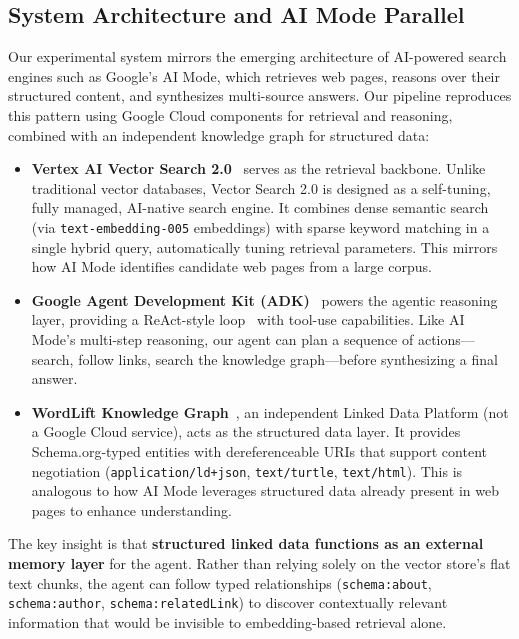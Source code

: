 \documentclass[runningheads]{llncs}
\begin{document}
\subsection{System Architecture and AI Mode Parallel}

Our experimental system mirrors the emerging architecture of AI-powered
search engines such as Google's AI Mode, which retrieves web pages,
reasons over their structured content, and synthesizes multi-source
answers.  Our pipeline reproduces this pattern using Google
Cloud components for retrieval and reasoning, combined with an
independent knowledge graph for structured data:

\begin{itemize}
    \item \textbf{Vertex AI Vector Search 2.0}~\cite{vertexai2025} serves
          as the retrieval backbone.  Unlike traditional vector databases,
          Vector Search 2.0 is designed as a self-tuning, fully managed,
          AI-native search engine.  It combines dense semantic search
          (via \texttt{text-embedding-005} embeddings) with sparse keyword
          matching in a single hybrid query, automatically tuning retrieval
          parameters.  This mirrors how AI Mode identifies candidate web
          pages from a large corpus.
    \item \textbf{Google Agent Development Kit (ADK)}~\cite{googleadk2025} powers
          the agentic reasoning layer, providing a ReAct-style
          loop~\cite{yao2023react} with tool-use capabilities.  Like AI
          Mode's multi-step reasoning, our agent can plan a sequence of
          actions---search, follow links, search the knowledge graph---before
          synthesizing a final answer.
    \item \textbf{WordLift Knowledge Graph}~\cite{volpini2015wordlift}, an
          independent Linked Data Platform (not a Google Cloud service),
          acts as the structured data layer.  It provides Schema.org-typed
          entities with dereferenceable URIs that support content
          negotiation (\texttt{application/ld+json}, \texttt{text/turtle},
          \texttt{text/html}).  This is analogous to how AI Mode leverages
          structured data already present in web pages to enhance
          understanding.
\end{itemize}

The key insight is that \textbf{structured linked data functions as an
external memory layer} for the agent.  Rather than relying solely on the
vector store's flat text chunks, the agent can follow typed relationships
(\texttt{schema:about}, \texttt{schema:author},
\texttt{schema:relatedLink}) to discover contextually relevant
information that would be invisible to embedding-based retrieval alone.
\end{document}
